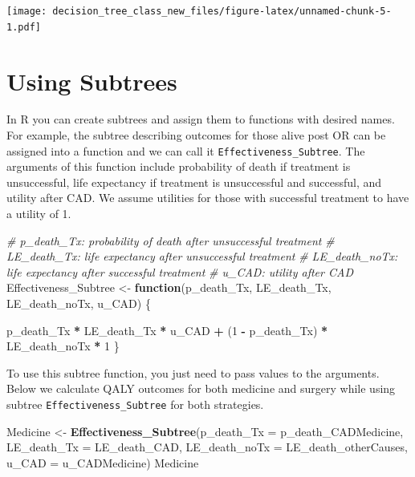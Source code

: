 \documentclass[
]{article}
\newenvironment{Shaded}{\begin{snugshade}}{\end{snugshade}}
\newcommand{\AttributeTok}[1]{\textcolor[rgb]{0.13,0.29,0.53}{#1}}
\newcommand{\CommentTok}[1]{\textcolor[rgb]{0.56,0.35,0.01}{\textit{#1}}}
\newcommand{\ControlFlowTok}[1]{\textcolor[rgb]{0.13,0.29,0.53}{\textbf{#1}}}
\newcommand{\DecValTok}[1]{\textcolor[rgb]{0.00,0.00,0.81}{#1}}
\newcommand{\FunctionTok}[1]{\textcolor[rgb]{0.13,0.29,0.53}{\textbf{#1}}}
\newcommand{\NormalTok}[1]{#1}
\newcommand{\OtherTok}[1]{\textcolor[rgb]{0.56,0.35,0.01}{#1}}
\newcommand{\SpecialCharTok}[1]{\textcolor[rgb]{0.81,0.36,0.00}{\textbf{#1}}}
\begin{document}
\texttt{[image: decision\_tree\_class\_new\_files/figure-latex/unnamed-chunk-5-1.pdf]}

\hypertarget{using-subtrees}{%
\section{Using Subtrees}\label{using-subtrees}}

In R you can create subtrees and assign them to functions with desired
names. For example, the subtree describing outcomes for those alive post
OR can be assigned into a function and we can call it
\texttt{Effectiveness\_Subtree}. The arguments of this function include
probability of death if treatment is unsuccessful, life expectancy if
treatment is unsuccessful and successful, and utility after CAD. We
assume utilities for those with successful treatment to have a utility
of 1.

\begin{Shaded}
\begin{Highlighting}[]
\CommentTok{\# p\_death\_Tx: probability of death after unsuccessful treatment}
\CommentTok{\# LE\_death\_Tx: life expectancy after unsuccessful treatment}
\CommentTok{\# LE\_death\_noTx: life expectancy after successful treatment}
\CommentTok{\# u\_CAD: utility after CAD}
\NormalTok{Effectiveness\_Subtree }\OtherTok{\textless{}{-}} \ControlFlowTok{function}\NormalTok{(p\_death\_Tx, LE\_death\_Tx, LE\_death\_noTx, u\_CAD) \{}
  
\NormalTok{                                      p\_death\_Tx  }\SpecialCharTok{*}\NormalTok{ LE\_death\_Tx   }\SpecialCharTok{*}\NormalTok{ u\_CAD }\SpecialCharTok{+} 
\NormalTok{                                 (}\DecValTok{1} \SpecialCharTok{{-}}\NormalTok{ p\_death\_Tx) }\SpecialCharTok{*}\NormalTok{ LE\_death\_noTx }\SpecialCharTok{*} \DecValTok{1}
\NormalTok{\}}
\end{Highlighting}
\end{Shaded}

To use this subtree function, you just need to pass values to the
arguments. Below we calculate QALY outcomes for both medicine and
surgery while using subtree \texttt{Effectiveness\_Subtree} for both
strategies.

\begin{Shaded}
\begin{Highlighting}[]
\NormalTok{Medicine }\OtherTok{\textless{}{-}} \FunctionTok{Effectiveness\_Subtree}\NormalTok{(}\AttributeTok{p\_death\_Tx    =}\NormalTok{ p\_death\_CADMedicine, }
                                  \AttributeTok{LE\_death\_Tx   =}\NormalTok{ LE\_death\_CAD, }
                                  \AttributeTok{LE\_death\_noTx =}\NormalTok{ LE\_death\_otherCauses, }
                                  \AttributeTok{u\_CAD         =}\NormalTok{ u\_CADMedicine)}
\NormalTok{Medicine}
\end{Highlighting}
\end{Shaded}
\end{document}

